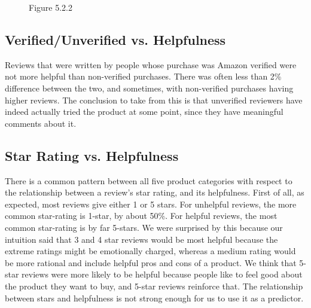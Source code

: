 \documentclass[11pt]{article}
\begin{document}
\begin{figure}[!htb]
\begin{center}
Figure 5.2.2
\end{center}
\end{figure}

\subsection{Verified/Unverified vs. Helpfulness}

Reviews that were written by people whose purchase was Amazon verified were not more helpful than non-verified purchases. There was often less than 2\% difference between the two, and sometimes, with non-verified purchases having higher reviews. The conclusion to take from this is that unverified reviewers have indeed actually tried the product at some point, since they have meaningful comments about it.

\subsection{Star Rating vs. Helpfulness}

There is a common pattern between all five product categories with respect to the relationship between a review’s star rating, and its helpfulness. First of all, as expected, most reviews give either 1 or 5 stars. For unhelpful reviews, the more common star-rating is 1-star, by about 50\%. For helpful reviews, the most common star-rating is by far 5-stars. We were surprised by this because our intuition said that 3 and 4 star reviews would be most helpful because the extreme ratings might be emotionally charged, whereas a medium rating would be more rational and include helpful pros and cons of a product. We think that 5-star reviews were more likely to be helpful because people like to feel good about the product they want to buy, and 5-star reviews reinforce that. The relationship between stars and helpfulness is not strong enough for us to use it as a predictor.
\end{document}
